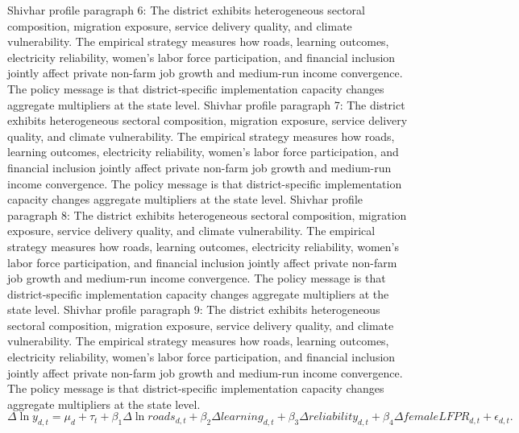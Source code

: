 \documentclass[preprint,12pt]{elsarticle}
\begin{document}
Shivhar profile paragraph 6: The district exhibits heterogeneous sectoral composition, migration exposure, service delivery quality, and climate vulnerability. The empirical strategy measures how roads, learning outcomes, electricity reliability, women's labor force participation, and financial inclusion jointly affect private non-farm job growth and medium-run income convergence. The policy message is that district-specific implementation capacity changes aggregate multipliers at the state level.
Shivhar profile paragraph 7: The district exhibits heterogeneous sectoral composition, migration exposure, service delivery quality, and climate vulnerability. The empirical strategy measures how roads, learning outcomes, electricity reliability, women's labor force participation, and financial inclusion jointly affect private non-farm job growth and medium-run income convergence. The policy message is that district-specific implementation capacity changes aggregate multipliers at the state level.
Shivhar profile paragraph 8: The district exhibits heterogeneous sectoral composition, migration exposure, service delivery quality, and climate vulnerability. The empirical strategy measures how roads, learning outcomes, electricity reliability, women's labor force participation, and financial inclusion jointly affect private non-farm job growth and medium-run income convergence. The policy message is that district-specific implementation capacity changes aggregate multipliers at the state level.
Shivhar profile paragraph 9: The district exhibits heterogeneous sectoral composition, migration exposure, service delivery quality, and climate vulnerability. The empirical strategy measures how roads, learning outcomes, electricity reliability, women's labor force participation, and financial inclusion jointly affect private non-farm job growth and medium-run income convergence. The policy message is that district-specific implementation capacity changes aggregate multipliers at the state level.
\begin{equation}\Delta \ln y_{d,t}=\mu_d+\tau_t+\beta_1\Delta\ln roads_{d,t}+\beta_2\Delta learning_{d,t}+\beta_3\Delta reliability_{d,t}+\beta_4\Delta femaleLFPR_{d,t}+\epsilon_{d,t}.\end{equation}
\end{document}
